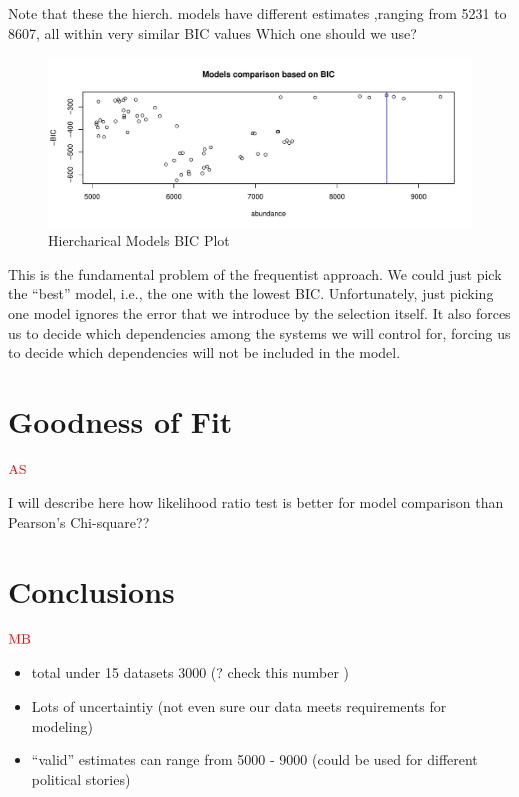 \documentclass[]{article}
\providecommand{\tightlist}{%
  \setlength{\itemsep}{0pt}\setlength{\parskip}{0pt}}
\begin{document}
Note that these the hierch. models have different estimates ,ranging
from 5231 to 8607, all within very similar BIC values Which one should
we use?

\begin{figure}
\centering
\includegraphics{Categorical-FinalProject_files/figure-latex/hierch-modelsBIC-1.pdf}
\caption{Hiercharical Models BIC Plot}
\end{figure}

This is the fundamental problem of the frequentist approach. We could
just pick the ``best'' model, i.e., the one with the lowest BIC.
Unfortunately, just picking one model ignores the error that we
introduce by the selection itself. It also forces us to decide which
dependencies among the systems we will control for, forcing us to decide
which dependencies will not be included in the model.

\hypertarget{goodness-of-fit}{%
\section{Goodness of Fit}\label{goodness-of-fit}}

\(\textcolor{red}{\text{AS}}\)

I will describe here how likelihood ratio test is better for model
comparison than Pearson's Chi-square??

\hypertarget{conclusions}{%
\section{Conclusions}\label{conclusions}}

\(\textcolor{red}{\text{MB}}\)

\begin{itemize}
\tightlist
\item
  total under 15 datasets 3000 (? check this number )
\item
  Lots of uncertaintiy (not even sure our data meets requirements for
  modeling)
\item
  ``valid'' estimates can range from 5000 - 9000 (could be used for
  different political stories)
\end{itemize}
\end{document}
